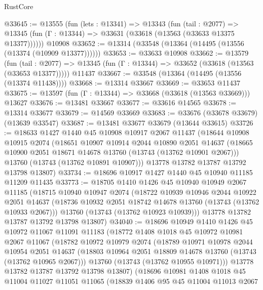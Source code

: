 \begin{lexlean}{RustCore}
\begin{coremodule}
@33645 := @13555
    (fun (lets : @13341) =>
    @13343
      (fun (tail : @2077) =>
      @13345 (fun (Γ : @13344) => @33631 (@33618 (@13563 (@33633 @13375 @13377))))))
    @10908
@33652 := @13314 (@33548 (@13364 (@14495 (@13556 (@13374 (@10909 @13377))))))
@33653 := @33633 @10908
@33662 := @13579
    (fun (tail : @2077) => @13345 (fun (Γ : @13344) => @33652 (@33618 (@13563 (@33653 @13377)))))
    @11437
@33667 := @33548 (@13364 (@14495 (@13556 (@13374 @11438))))
@33668 := @13314 @33667
@33669 := @33653 @11437
@33675 := @13597 (fun (Γ : @13344) => @33668 (@33618 (@13563 @33669))) @13627
@33676 := @13481 @33667
@33677 := @33616 @14565
@33678 := @13314 @33677
@33679 := @14569 @33669
@33683 := @33676 (@33678 @33679) (@13639 @33547)
@33687 := @13481 @33677 @33679 (@13644 @33615)
@33726 := @18633
    @1427
    @1440
    @45
    @10908
    @10917
    @2067
    @11437
    (@18644
      @10908
      @10915
      @2074
      (@18651
        @10907
        @10914
        @2044
        @10890
        @2051
        @14637
        (@18665 @10900 @2051 @18671 @14678 @13760 (@13743 (@13762 @10901 @2067)))
        @13760
        (@13743 (@13762 @10891 @10907)))
      @13778
      @13782
      @13787
      @13792
      @13798
      @13807)
@33734 := @18696 @10917 @1427 @1440 @45 @10940 @11185 @11209 @11435
@33773 := @18705
    @1410
    @1426
    @45
    @10940
    @10949
    @2067
    @11185
    (@18715
      @10940
      @10947
      @2074
      (@18722
        @10939
        @10946
        @2044
        @10922
        @2051
        @14637
        (@18736 @10932 @2051 @18742 @14678 @13760 (@13743 (@13762 @10933 @2067)))
        @13760
        (@13743 (@13762 @10923 @10939)))
      @13778
      @13782
      @13787
      @13792
      @13798
      @13807)
@34040 := @18696
    @10949
    @1410
    @1426
    @45
    @10972
    @11067
    @11091
    @11183
    (@18772
      @1408
      @1018
      @45
      @10972
      @10981
      @2067
      @11067
      (@18782
        @10972
        @10979
        @2074
        (@18789
          @10971
          @10978
          @2044
          @10954
          @2051
          @14637
          (@18803 @10964 @2051 @18809 @14678 @13760 (@13743 (@13762 @10965 @2067)))
          @13760
          (@13743 (@13762 @10955 @10971)))
        @13778
        @13782
        @13787
        @13792
        @13798
        @13807)
      (@18696
        @10981
        @1408
        @1018
        @45
        @11004
        @11027
        @11051
        @11065
        (@18839
          @1406
          @95
          @45
          @11004
          @11013
          @2067

\end{coremodule}
\end{lexlean}
